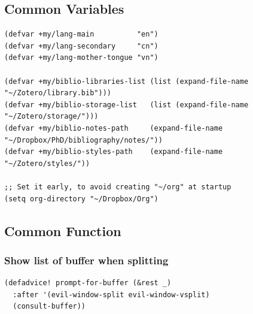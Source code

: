 \documentclass[11pt]{article}
\begin{document}
\subsection{Common Variables}
\label{sec:org96c2ac4}
\begin{verbatim}
(defvar +my/lang-main          "en")
(defvar +my/lang-secondary     "cn")
(defvar +my/lang-mother-tongue "vn")

(defvar +my/biblio-libraries-list (list (expand-file-name "~/Zotero/library.bib")))
(defvar +my/biblio-storage-list   (list (expand-file-name "~/Zotero/storage/")))
(defvar +my/biblio-notes-path     (expand-file-name "~/Dropbox/PhD/bibliography/notes/"))
(defvar +my/biblio-styles-path    (expand-file-name "~/Zotero/styles/"))

;; Set it early, to avoid creating "~/org" at startup
(setq org-directory "~/Dropbox/Org")
\end{verbatim}

\subsection{Common Function}
\label{sec:org39b7a67}
\subsubsection{Show list of buffer when splitting}
\label{sec:orgbfddb4a}
\begin{verbatim}
(defadvice! prompt-for-buffer (&rest _)
  :after '(evil-window-split evil-window-vsplit)
  (consult-buffer))
\end{verbatim}
\end{document}
